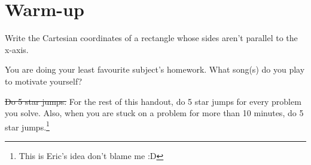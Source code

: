 \documentclass[11pt]{scrartcl}
\begin{document}
\section{Warm-up}
\begin{exercise}
  Write the Cartesian coordinates of a rectangle whose sides aren't parallel to the x-axis.
\end{exercise}
\begin{exercise}
  You are doing your least favourite subject's homework. What song(s) do you play to motivate yourself?
\end{exercise}
\begin{exercise}
  \st{Do 5 star jumps.} For the rest of this handout, do 5 star jumps for every problem you solve. Also, when you are stuck on a problem for more than 10 minutes, do 5 star jumps.\footnote{This is Eric's idea don't blame me :D}
\end{exercise}
\end{document}
